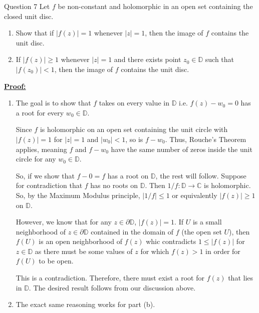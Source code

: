 \documentclass{article}
\newcommand{\C}{\mathbb{C}}
\begin{document}
\begin{mathdefinitionbox}{Question 7}
\vskip 0.5cm
Let $f$ be non-constant and holomorphic in an open set containing the closed unit disc.
\begin{enumerate}[label=(\alph*)]
  \item Show that if $|f(z)| = 1$ whenever $|z| = 1$, then the image of $f$ contains the unit disc. 
  \item If $|f(z)| \geq 1$ whenever $|z| = 1$ and there exists point $z_0 \in \mathbb{D}$ such that $|f(z_0)| < 1$, then the image of $f$ contains the unit disc.
\end{enumerate}
\end{mathdefinitionbox}

\vskip 0.5cm
\underline{\textbf{Proof:}}

\begin{enumerate}[label=(\alph*)]
  \item The goal is to show that $f$ takes on every value in $\mathbb{D}$ i.e. $f(z) - w_0 = 0$ has a root for every $w_0 \in \mathbb{D}$. 
  
  \vskip 0.5cm
  Since $f$ is holomorphic on an open set containing the unit circle with $|f(z)| = 1$ for $|z| = 1$ and $|w_0| < 1$, so is $f-w_0$. Thus, Rouche's Theorem applies, meaning $f$ and $f-w_0$ have the same number of zeros inside the unit circle for any $w_0 \in \mathbb{D}$.

  \vskip 0.5cm
  So, if we show that $f - 0 = f$ has a root on $\mathbb{D}$, the rest will follow. Suppose for contradiction  that $f$ has no roots on $\mathbb{D}$. Then $1/f : \mathbb{D} \rightarrow \C$ is holomorphic. So, by the Maximum Modulus principle, $\left| 1/f \right| \leq 1$ or equivalently $|f(z)| \geq 1$ on $\mathbb{D}$.

  \vskip 0.5cm
  However, we know that for any $z \in \partial \mathbb{D}$, $|f(z)| = 1$. If $U$ is a small neighborhood of $z \in \partial \mathbb{D}$ contained in the domain of $f$ (the open set $U$), then $f(U)$ is an open neighborhood of $f(z)$ whic contradicts $1 \leq |f(z)|$ for $z \in \mathbb{D}$ as there must be some values of $z$ for which $f(z) > 1$ in order for $f(U)$ to be open.

  \vskip 0.5cm
  This is a contradiction. Therefore, there must exist a root for $f(z)$ that lies in $\mathbb{D}$. The desired result follows from our discussion above.

  \vskip 0.5cm
  \item The exact same reasoning works for part (b).
\end{enumerate}
\end{document}
